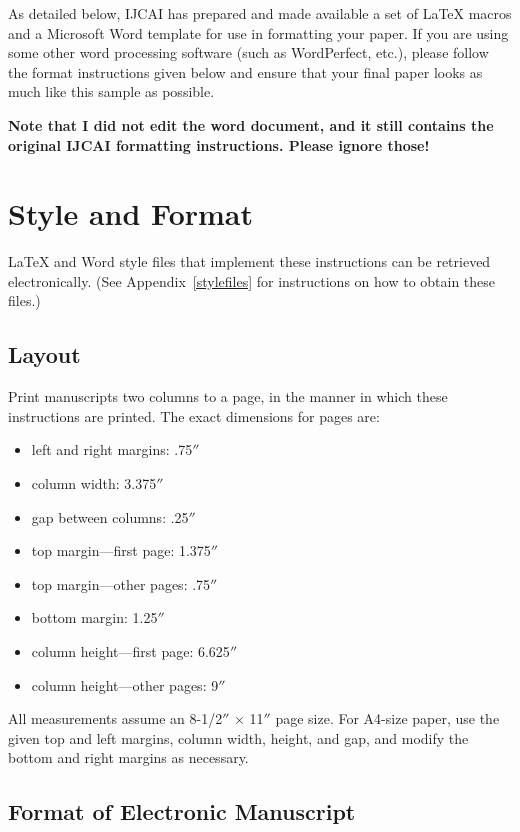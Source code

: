 \documentclass{article}
\begin{document}
As detailed below, IJCAI has prepared and made available a set of
\LaTeX{} macros and a Microsoft Word template for use in formatting
your paper. If you are using some other word processing software (such
as WordPerfect, etc.), please follow the format instructions given
below and ensure that your final paper looks as much like this sample
as possible.

{\bf Note that I did not edit the word document, and it still contains the original IJCAI formatting instructions. Please ignore those!}

\section{Style and Format}

\LaTeX{} and Word style files that implement these instructions
can be retrieved electronically. (See Appendix~\ref{stylefiles} for
instructions on how to obtain these files.)

\subsection{Layout}

Print manuscripts two columns to a page, in the manner in which these
instructions are printed. The exact dimensions for pages are:
\begin{itemize}
\item left and right margins: .75$''$
\item column width: 3.375$''$
\item gap between columns: .25$''$
\item top margin---first page: 1.375$''$
\item top margin---other pages: .75$''$
\item bottom margin: 1.25$''$
\item column height---first page: 6.625$''$
\item column height---other pages: 9$''$
\end{itemize}

All measurements assume an 8-1/2$''$ $\times$ 11$''$ page size. For
A4-size paper, use the given top and left margins, column width,
height, and gap, and modify the bottom and right margins as necessary.

\subsection{Format of Electronic Manuscript}
\end{document}
